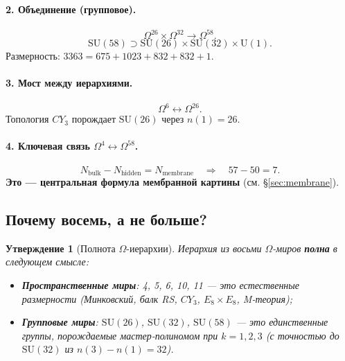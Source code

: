 \documentclass[11pt,a4paper]{article}
\newcommand{\SU}{\mathrm{SU}}
\newcommand{\CY}{CY_3}
\newcommand{\Om}{\Omega^4}
\newcommand{\Oms}{\Omega^6}
\newcommand{\Omtw}{\Omega^{26}}
\newcommand{\Omth}{\Omega^{32}}
\newcommand{\Omfi}{\Omega^{58}}
\newcommand{\Nbulk}{N_{\text{bulk}}}
\newcommand{\Nhidden}{N_{\text{hidden}}}
\newcommand{\Nmembrane}{N_{\text{membrane}}}
\newtheorem{proposition}[theorem]{Утверждение}
\theoremstyle{definition}
\begin{document}
\paragraph{2. Объединение (групповое).}
\begin{equation}
    \Omtw \times \Omth \to \Omfi.
\end{equation}
\begin{equation}
    \SU(58) \supset \SU(26) \times \SU(32) \times \mathrm{U}(1).
\end{equation}
Размерность: $3363 = 675 + 1023 + 832 + 832 + 1$.

\paragraph{3. Мост между иерархиями.}
\begin{equation}
    \Oms \leftrightarrow \Omtw.
\end{equation}
Топология $\CY$ порождает $\SU(26)$ через $n(1) = 26$.

\paragraph{4. Ключевая связь $\Om \leftrightarrow \Omfi$.}
\begin{equation}
    \boxed{
    \Nbulk - \Nhidden = \Nmembrane
    \quad\Longrightarrow\quad
    57 - 50 = 7.
    }
    \label{eq:field-balance}
\end{equation}
\textbf{Это — центральная формула мембранной картины} 
(см. §\ref{sec:membrane}).

\subsection{Почему восемь, а не больше?}
\label{subsec:why-eight}

\begin{proposition}[Полнота $\Omega$-иерархии]
\label{prop:completeness}
Иерархия из восьми $\Omega$-миров \textbf{полна} в следующем 
смысле:
\begin{itemize}
    \item \textbf{Пространственные миры}: 4, 5, 6, 10, 11 — 
          это \emph{естественные} размерности (Минковский, 
          балк RS, $\CY$, $E_8 \times E_8$, M-теория);
    \item \textbf{Групповые миры}: $\SU(26)$, $\SU(32)$, 
          $\SU(58)$ — это \emph{единственные} группы, порождаемые 
          мастер-полиномом при $k = 1, 2, 3$ (с точностью до 
          $\SU(32)$ из $n(3) - n(1) = 32$).
\end{itemize}
\end{proposition}
\end{document}
